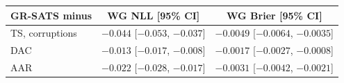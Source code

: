 \begin{tabular}{@{}lcc@{}}
\toprule
\textbf{GR-SATS minus} & \textbf{WG NLL [95\% CI]} & \textbf{WG Brier [95\% CI]} \\
\midrule
TS, corruptions & $-0.044$ [$-0.053$, $-0.037$] & $-0.0049$ [$-0.0064$, $-0.0035$] \\
DAC & $-0.013$ [$-0.017$, $-0.008$] & $-0.0017$ [$-0.0027$, $-0.0008$] \\
AAR & $-0.022$ [$-0.028$, $-0.017$] & $-0.0031$ [$-0.0042$, $-0.0021$] \\
\bottomrule
\end{tabular}
